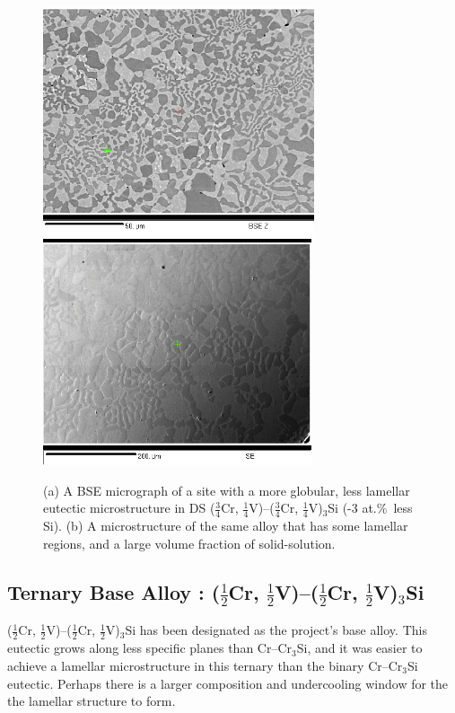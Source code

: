 %
\begin{figure}[H]
\begin{center}
\includegraphics[width=8cm]{_Sep6_grid_iv_75Cr_scale_beforeBSE}
\includegraphics[width=7.9cm]{_Jun20_0975Cr25V_eut_comp_bham_arc_side_100um_BSE_scale}
\caption{(a) A BSE micrograph of a site with a more globular, less lamellar eutectic microstructure in DS ($\frac{3}{4}$Cr, $\frac{1}{4}$V)--($\frac{3}{4}$Cr, $\frac{1}{4}$V)$_3$Si (-3 at.\%\ less Si). (b) A microstructure of the same alloy that has some lamellar regions, and a large volume fraction of solid-solution.}
\label{fig:75CrgridivBSE}
\end{center}
\end{figure}
%


\subsection{Ternary Base Alloy : ($\frac{1}{2}$Cr, $\frac{1}{2}$V)--($\frac{1}{2}$Cr, $\frac{1}{2}$V)$_3$Si}

($\frac{1}{2}$Cr, $\frac{1}{2}$V)--($\frac{1}{2}$Cr, $\frac{1}{2}$V)$_3$Si has been designated as the project's base alloy.  This eutectic grows along less specific planes than Cr--Cr$_3$Si, and it was easier to achieve a lamellar microstructure in this ternary than the binary Cr--Cr$_3$Si eutectic.  Perhaps there is a larger composition and undercooling window for the the lamellar structure to form.

